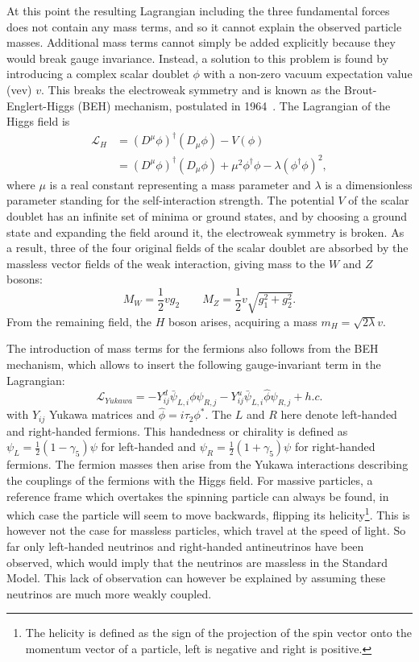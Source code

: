 At this point the resulting Lagrangian including the three fundamental forces does not contain any mass terms, and so it cannot explain the observed particle masses. Additional mass terms cannot simply be added explicitly because they would break gauge invariance. Instead, a solution to this problem is found by introducing a complex scalar doublet $\phi$ with a non-zero vacuum expectation value (vev) $v$. This breaks the electroweak symmetry and is known as the Brout-Englert-Higgs (BEH) mechanism, postulated in 1964~\cite{Englert:1964et,Higgs:1964pj, Guralnik:1964eu}. The Lagrangian of the Higgs field is
 \begin{align}
   \mathcal{L}_H &= (D^{\mu}\phi)^{\dagger}(D_{\mu}\phi) - V(\phi)\nonumber\\
   &= (D^{\mu}\phi)^{\dagger}(D_{\mu}\phi) +\mu^2\phi^{\dagger}\phi - \lambda(\phi^{\dagger}\phi)^2,
 \end{align}
where $\mu$ is a real constant representing a mass parameter and $\lambda$ is a dimensionless parameter standing for the self-interaction strength. The potential $V$ of the scalar doublet has an infinite set of minima or ground states, and by choosing a ground state and expanding the field around it, the electroweak symmetry is broken. As a result, three of the four original fields of the scalar doublet are absorbed by the massless vector fields of the weak interaction, giving mass to the $W$ and $Z$ bosons:
\begin{equation}
 M_W = \frac{1}{2}vg_2 \qquad M_Z = \frac{1}{2}v\sqrt{g_1^2 + g_2^2}.
\end{equation}
From the remaining field, the $H$ boson arises, acquiring a mass $m_H = \sqrt{2\lambda} v$.

The introduction of mass terms for the fermions also follows from the BEH mechanism, which allows to insert the following gauge-invariant term in the Lagrangian:
\begin{equation}
  \mathcal{L}_{Yukawa} = -Y^d_{ij}\bar{\psi}_{L,i}\phi\psi_{R,j} -Y^u_{ij}\bar{\psi}_{L,i}\hat{\phi}\psi_{R,j}   + h.c.
\end{equation}
with $Y_{ij}$ Yukawa matrices and $\hat{\phi} = i\tau_2\phi^*$. The $L$ and $R$ here denote left-handed and right-handed fermions. This handedness or chirality is defined as $\psi_{L} = \frac{1}{2}(1-\gamma_5)\psi$ for left-handed and $\psi_{R} = \frac{1}{2}(1+\gamma_5)\psi$ for right-handed fermions. The fermion masses then arise from the Yukawa interactions describing the couplings of the fermions with the Higgs field. For massive particles, a reference frame which overtakes the spinning particle can always be found, in which case the particle will seem to move backwards, flipping its helicity\footnote{The helicity is defined as the sign of the projection of the spin vector onto the momentum vector of a particle, left is negative and right is positive.}. This is however not the case for massless particles, which travel at the speed of light. So far only left-handed neutrinos and right-handed antineutrinos have been observed, which would imply that the neutrinos are massless in the Standard Model. This lack of observation can however be explained by assuming these neutrinos are much more weakly coupled.


